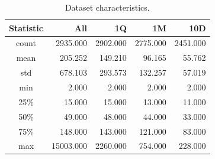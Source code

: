 \documentclass[conference]{IEEEtran}
\begin{document}
\begin{table}[!t]
	\renewcommand{\arraystretch}{1.3}
	\caption{Dataset characteristics. }
	\label{dataset_description}
	\centering
	\begin{tabular}{c|r|r|r|r}
		Statistic &        All  & 1Q & 1M & 10D \\
		\hline
		count &  2935.000  &     2902.000  &   2775.000 &   2451.000 \\
		mean  &   205.252  &      149.210  &     96.165 &     55.762 \\
		std   &   678.103  &      293.573  &    132.257 &     57.019 \\
		min   &     2.000  &        2.000  &      2.000 &      2.000 \\
		25\%   &    15.000  &       15.000  &     13.000 &     11.000 \\
		50\%   &    49.000  &       48.000  &     44.000 &     33.000 \\
		75\%   &   148.000  &      143.000  &    121.000 &     83.000 \\
		max   & 15003.000  &     2260.000  &    754.000 &    228.000 \\

	\end{tabular}
\end{table}
\end{document}
